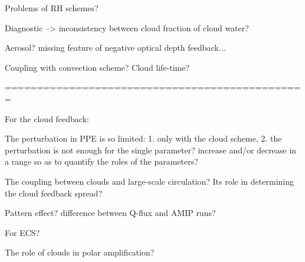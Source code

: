 Problems of RH schemes?

Diagnostic --> inconsistency between cloud fraction of cloud water?

Aerosol? missing feature of negative optical depth feedback...

Coupling with convection scheme? Cloud life-time?

===============================================

For the cloud feedback:

The perturbation in PPE is so limited: 1. only with the cloud scheme, 2. the perturbation is not enough for the single parameter? increase and/or decrease in a range so as to quantify the roles of the parameters? 

The coupling between clouds and large-scale circulation? Its role in determining the cloud feedback spread?

Pattern effect? difference between Q-flux and AMIP runs?

For ECS?

The role of clouds in polar amplification?


